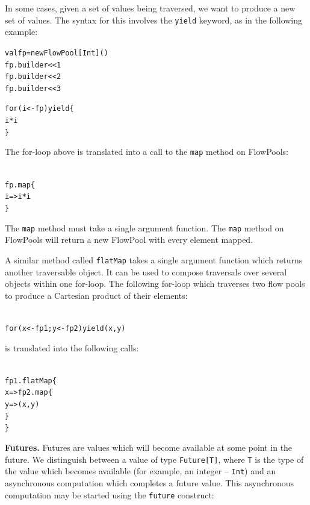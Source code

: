 \documentclass[runningheads,a4paper]{llncs}
\begin{document}
In some cases, given a set of values being traversed, we want to produce a new
set of values.
The syntax for this involves the \verb=yield= keyword, as in the following example:

\begin{minipage}[b]{3.75 cm}
\begin{alltt}
{\scriptsize
val fp = new FlowPool[Int]()
fp.builder << 1
fp.builder << 2
fp.builder << 3

for (i <- fp) yield \{
  i * i
\}
}
\end{alltt}
\end{minipage}

The for-loop above is translated into a call to the \verb=map= method on FlowPools:

\begin{minipage}[b]{3.75 cm}
\begin{alltt}
{\scriptsize
fp.map \{
  i => i * i
\}
}
\end{alltt}
\end{minipage}

The \verb=map= method must take a single argument function.
The \verb=map= method on FlowPools will return a new FlowPool with every
element mapped.

A similar method called \verb=flatMap= takes a single argument function
which returns another traversable object.
It can be used to compose traversals over several objects within one
for-loop.
The following for-loop which traverses two flow pools to produce a
Cartesian product of their elements:

\begin{minipage}[b]{3.75 cm}
\begin{alltt}
{\scriptsize
for (x <- fp1; y <- fp2) yield (x, y)
}
\end{alltt}
\end{minipage}

is translated into the following calls:

\begin{minipage}[b]{3.75 cm}
\begin{alltt}
{\scriptsize
fp1.flatMap \{
  x => fp2.map \{
    y => (x, y)
  \}
\}
}
\end{alltt}
\end{minipage}


\textbf{Futures.}
Futures are values which will become available at some point in the future.
We distinguish between a value of type \verb=Future[T]=, where \verb=T= is
the type of the value which becomes available (for example, an
integer -- \verb=Int=) and an asynchronous computation which completes a
future value.
This asynchronous computation may be started using the \verb=future= construct:
\end{document}
